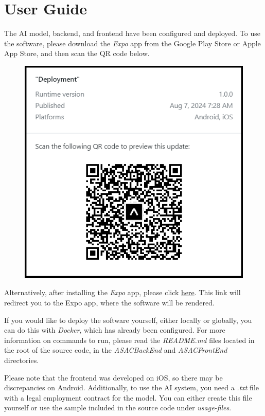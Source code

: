 \chapter{User Guide}

The AI model, backend, and frontend have been configured and deployed. To use the software, please download the \textit{Expo} app from the Google Play Store or Apple App Store, and then scan the QR code below.

\begin{figure}[!ht]
    \centering
    \includegraphics[width=0.5\linewidth]{LATEX/Appendices/Images/Software/deployed-app-qr-code.png}
    
    \label{fig:deployed-app-qr-codel}
\end{figure}

Alternatively, after installing the \textit{Expo} app, please click \href{https://expo.dev/preview/update?message=Deployment&updateRuntimeVersion=1.0.0&createdAt=2024-08-07T06\%3A28\%3A05.730Z&slug=exp&projectId=0a2a6a79-5818-4f5a-9566-594e07108536&group=fecf04f0-ab35-4650-b482-97adfa35e0a5}{here}. This link will redirect you to the Expo app, where the software will be rendered.

If you would like to deploy the software yourself, either locally or globally, you can do this with \textit{Docker}, which has already been configured. For more information on commands to run, please read the \textit{README.md} files located in the root of the source code, in the \textit{ASACBackEnd} and \textit{ASACFrontEnd} directories.

Please note that the frontend was developed on iOS, so there may be discrepancies on Android. Additionally, to use the AI system, you need a \textit{.txt} file with a legal employment contract for the model. You can either create this file yourself or use the sample included in the source code under \textit{usage-files}.


